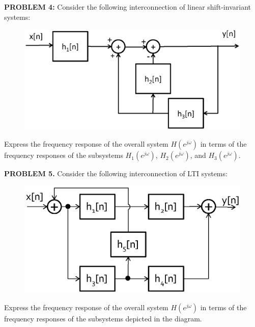 \documentclass[11pt]{article}
\begin{document}
\vspace{1cm}



\textbf{PROBLEM 4:}  Consider the following interconnection of linear shift-invariant systems:

\begin{figure}[ht!]
\centering
\includegraphics[width=.7\textwidth]{fig1.eps}
\end{figure}

Express the frequency response of the overall system $H(e^{j\omega})$ in terms of the frequency responses of the subsystems $H_1(e^{j\omega})$, $H_2(e^{j\omega})$, and $H_3(e^{j\omega})$.

\vspace{1cm}





\textbf{PROBLEM 5.} Consider the following interconnection of LTI systems:

\begin{figure}[ht!]
\centering
\includegraphics[width=.7\textwidth]{fig3.eps}
\end{figure}

Express the frequency response of the overall system $H(e^{j\omega})$ in terms of the frequency responses of the subsystems depicted in the diagram.

\vspace{1cm}
 
\end{document}
